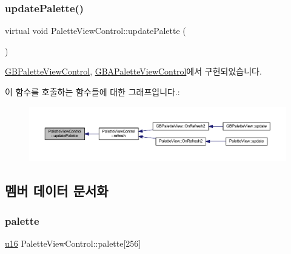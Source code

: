 \subsubsection{\texorpdfstring{update\+Palette()}{updatePalette()}}
{\footnotesize\ttfamily virtual void Palette\+View\+Control\+::update\+Palette (\begin{DoxyParamCaption}{ }\end{DoxyParamCaption})\hspace{0.3cm}{\ttfamily [pure virtual]}}



\mbox{\hyperlink{class_g_b_palette_view_control_a0fb70c16ea8f4731e7159df59beb3c6e}{G\+B\+Palette\+View\+Control}}, \mbox{\hyperlink{class_g_b_a_palette_view_control_a020d7db2f3efb69b4e08d1b5fb351850}{G\+B\+A\+Palette\+View\+Control}}에서 구현되었습니다.

이 함수를 호출하는 함수들에 대한 그래프입니다.\+:
\nopagebreak
\begin{figure}[H]
\begin{center}
\leavevmode
\includegraphics[width=350pt]{class_palette_view_control_a12772d59f8e890a920cb200d2f6a4b7a_icgraph}
\end{center}
\end{figure}


\subsection{멤버 데이터 문서화}
\mbox{\label{class_palette_view_control_a1a5ce1812cf6c8d26889f4eb03d1d4ec}} 
\subsubsection{\texorpdfstring{palette}{palette}}
{\footnotesize\ttfamily \mbox{\hyperlink{_system_8h_a9e6c91d77e24643b888dbd1a1a590054}{u16}} Palette\+View\+Control\+::palette\mbox{[}256\mbox{]}\hspace{0.3cm}{\ttfamily [protected]}}



